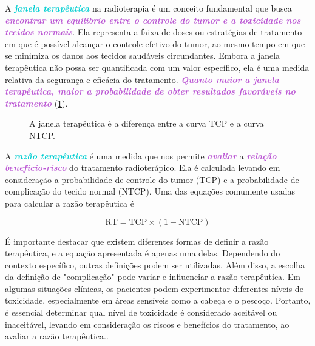 \documentclass[11pt,a4paper]{article}
\begin{document}
	A \textcolor{DarkTurquoise}{\textbf{\textit{janela terapêutica}}} na radioterapia é um conceito fundamental que busca \textcolor{MediumOrchid}{\textbf{\textit{encontrar um equilíbrio entre o controle do tumor e a toxicidade nos tecidos normais}}}. Ela representa a faixa de doses ou estratégias de tratamento em que é possível alcançar o controle efetivo do tumor, ao mesmo tempo em que se minimiza os danos aos tecidos saudáveis circundantes. Embora a janela terapêutica não possa ser quantificada com um valor específico, ela é uma medida relativa da segurança e eficácia do tratamento. \textcolor{MediumOrchid}{\textbf{\textit{Quanto maior a janela terapêutica, maior a probabilidade de obter resultados favoráveis no tratamento}}} (\ref{fig:TcpENtcp}).


	\begin{figure}[h]
		\centering
		\caption{A janela terapêutica é a diferença entre a curva TCP e a curva NTCP.}
		\label{fig:TcpENtcp}
	\end{figure}

	A \textcolor{DarkTurquoise}{\textbf{\textit{razão terapêutica}}} é uma medida que nos permite \textcolor{MediumOrchid}{\textbf{\textit{avaliar}}} a \textcolor{MediumOrchid}{\textbf{\textit{relação benefício-risco}}} do tratamento radioterápico. Ela é calculada levando em consideração a probabilidade de controle do tumor (TCP) e a probabilidade de complicação do tecido normal (NTCP). Uma das equações comumente usadas para calcular a razão terapêutica é 
	
	\begin{equation}
		\text{RT} = \text{TCP} \times (1 - \text{NTCP})
	\end{equation}
	 

	É importante destacar que existem diferentes formas de definir a razão terapêutica, e a equação apresentada é apenas uma delas. Dependendo do contexto específico, outras definições podem ser utilizadas. Além disso, a escolha da definição de "complicação" pode variar e influenciar a razão terapêutica. Em algumas situações clínicas, os pacientes podem experimentar diferentes níveis de toxicidade, especialmente em áreas sensíveis como a cabeça e o pescoço. Portanto, é essencial determinar qual nível de toxicidade é considerado aceitável ou inaceitável, levando em consideração os riscos e benefícios do tratamento, ao avaliar a razão terapêutica..
		
\end{document}
